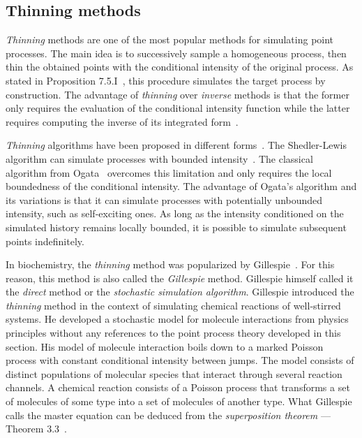 \documentclass{juliacon}
\begin{document}
\subsection{Thinning methods} \label{subsec:sim-thinning}

\textit{Thinning} methods are one of the most popular methods for simulating point processes. The main idea is to successively sample a homogeneous process, then thin the obtained points with the conditional intensity of the original process. As stated in Proposition 7.5.I~\cite{daley2003}, this procedure simulates the target process by construction. The advantage of \textit{thinning} over \textit{inverse} methods is that the former only requires the evaluation of the conditional intensity function while the latter requires computing the inverse of its integrated form~\cite{daley2003}.

\textit{Thinning} algorithms have been proposed in different forms~\cite{daley2003}. The Shedler-Lewis algorithm can simulate processes with bounded intensity~\cite{lewis1976}. The classical algorithm from Ogata~\cite{ogata1981} overcomes this limitation and only requires the local boundedness of the conditional intensity. The advantage of Ogata's algorithm and its variations is that it can simulate processes with potentially unbounded intensity, such as self-exciting ones. As long as the intensity conditioned on the simulated history remains locally bounded, it is possible to simulate subsequent points indefinitely.

In biochemistry, the \textit{thinning} method was popularized by Gillespie~\cite{gillespie1976,gillespie1977}. For this reason, this method is also called the \textit{Gillespie} method. Gillespie himself called it the \textit{direct} method or the \textit{stochastic simulation algorithm}. Gillespie introduced the \textit{thinning} method in the context of simulating chemical reactions of well-stirred systems. He developed a stochastic model for molecule interactions from physics principles without any references to the point process theory developed in this section. His model of molecule interaction boils down to a marked Poisson process with constant conditional intensity between jumps. The model consists of distinct populations of molecular species that interact through several reaction channels. A chemical reaction consists of a Poisson process that transforms a set of molecules of some type into a set of molecules of another type. What Gillespie calls the master equation can be deduced from the \textit{superposition theorem} --- Theorem 3.3~\cite{last2017}.
\end{document}
